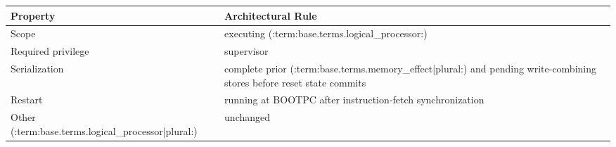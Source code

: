\Needspace{1.25in}
\begingroup\footnotesize
\setlength{\aboverulesep}{0pt}
\setlength{\belowrulesep}{0pt}
\setlength{\extrarowheight}{1.2pt}
\begin{center}
\begin{tabularx}{\linewidth}{@{}>{\raggedright\arraybackslash}p{1.35in}>{\raggedright\arraybackslash}X@{}}
\toprule
\rowcolor{BedrockHeaderFill}
\textbf{Property} & \textbf{Architectural Rule}\\
\midrule
Scope & executing (:term:base.terms.logical_processor:)\\
Required privilege & supervisor\\
Serialization & complete prior (:term:base.terms.memory_effect|plural:) and pending write-combining stores before reset state commits\\
Restart & running at BOOTPC after instruction-fetch synchronization\\
Other (:term:base.terms.logical_processor|plural:) & unchanged\\
\bottomrule
\end{tabularx}
\end{center}
\endgroup


